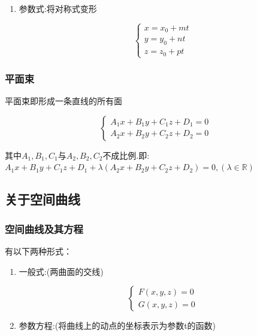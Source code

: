 \documentclass[UTF8,12pt]{ctexbook}
\newcommand{\mathRealNumberCollection}{\mathbb{R}}
\begin{document}
{{{{\begin{enumerate}
{              设点$M(x,y,z),M_0(x_0,y_0,z_0)$是直线$L$上的任意两点,那么存在向量$\vec{M_0M}$与直线$L$的方向向量$\vec{s}$平行.因此两向量的对应坐标成比例.$(\vec{M_0M} = (x - x_0, y - y_0, z - z_0), \vec{s} = (m,n,p))$，因此得出:

              $\cfrac{x - x_0}{m} = \cfrac{y - y_0}{n} = \cfrac{z - z_0}{p} = t$
              }
        \item {
              参数式:将对称式变形

              $$
                \begin{cases}
                  x = x_0 + mt \\
                  y = y_0 + nt \\
                  z = z_0 + pt
                \end{cases}
              $$
              }
      \end{enumerate}
    }%

    \subsubsection{平面束}{
      平面束即形成一条直线的所有面

      $$
        \begin{cases}
          A_1x + B_1y + C_1z + D_1 = 0 \\
          A_2x + B_2y + C_2z + D_2 = 0
        \end{cases}
      $$

      其中$A_1,B_1,C_1$与$A_2,B_2,C_2$不成比例.即:$A_1x + B_1y + C_1z + D_1 + \lambda(A_2x + B_2y + C_2z + D_2) = 0, (\lambda \in \mathRealNumberCollection)$
    }%

  }%

  \subsection{关于空间曲线}{

    \subsubsection{空间曲线及其方程}{
      有以下两种形式：

      \begin{enumerate}
        \item {
              一般式:(两曲面的交线)

              $$
                \begin{cases}
                  F(x,y,z) = 0 \\
                  G(x,y,z) = 0
                \end{cases}
              $$
              }
        \item {
              参数方程:(将曲线上的动点的坐标表示为参数t的函数)

}
\end{enumerate}}}}}
\end{document}
